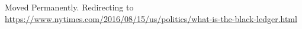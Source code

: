 Moved Permanently. Redirecting to
\url{https://www.nytimes.com/2016/08/15/us/politics/what-is-the-black-ledger.html}
